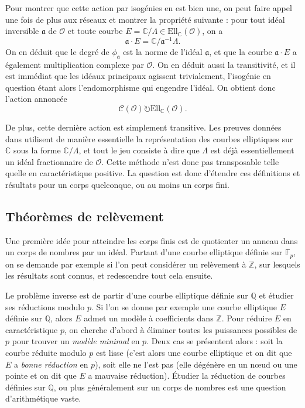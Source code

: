 \documentclass[11pt,a4paper]{article}
\newcommand{\Z}{\mathbb{Z}}
\newcommand{\C}{\mathbb{C}}
\newcommand{\F}{\mathbb{F}}
\newcommand{\Q}{\mathbb{Q}}
\renewcommand{\O}{\mathcal{O}}
\newcommand{\Cl}{\mathcal{C}}
\newcommand{\Ell}{\mathrm{Ell}}
\renewcommand{\frak}{\mathfrak}
\renewcommand{\v}{\vspace{5mm}}
\theoremstyle{definition}
\begin{document}
\v

Pour montrer que cette action par isogénies en est bien une, on peut faire appel une fois de plus aux réseaux et montrer la propriété suivante : pour tout idéal inversible $\frak a$ de $\O$ et toute courbe $E=\C/\Lambda\in \Ell_\C(\O)$, on a
$$\frak a\cdot E = \C/\frak a^{-1} \Lambda.$$
On en déduit que le degré de $\phi_{\frak a}$ est la norme de l'idéal $\frak a$, et que la courbe $\frak a\cdot E$ a également multiplication complexe par $\O$. On en déduit aussi la transitivité, et il est immédiat que les idéaux principaux agissent trivialement, l'isogénie en question étant alors l'endomorphisme qui engendre l'idéal. On obtient donc l'action annoncée
$$\Cl(\O) \circlearrowright \Ell_\C(\O).$$

De plus, cette dernière action est simplement transitive. Les preuves données dans \cite{Sil2} utilisent de manière essentielle la représentation des courbes elliptiques sur $\C$ sous la forme $\C/\Lambda$, et tout le jeu consiste à dire que $\Lambda$ est déjà essentiellement un idéal fractionnaire de $\O$. Cette méthode n'est donc pas transposable telle quelle en caractéristique positive. La question est donc d'étendre ces définitions et résultats pour un corps quelconque, ou au moins un corps fini.

\subsection{Théorèmes de relèvement}

Une première idée pour atteindre les corps finis est de quotienter un anneau dans un corps de nombres par un idéal. Partant d'une courbe elliptique définie sur $\F_p$, on se demande par exemple si l'on peut considérer un relèvement à $\Z$, sur lesquels les résultats sont connus, et redescendre tout cela ensuite. 

Le problème inverse est de partir d'une courbe elliptique définie sur $\Q$ et étudier ses réductions modulo $p$. Si l'on se donne par exemple une courbe elliptique $E$ définie sur $\Q$, alors $E$ admet un modèle à coefficients dans $\Z$. Pour réduire $E$ en caractéristique $p$, on cherche d'abord à éliminer toutes les puissances possibles de $p$ pour trouver un \emph{modèle minimal} en $p$. Deux cas se présentent alors : soit la courbe réduite modulo $p$ est lisse (c'est alors une courbe elliptique et on dit que $E$ a \emph{bonne réduction} en $p$), soit elle ne l'est pas (elle dégénère en un n\oe ud ou une pointe et on dit que $E$ a mauvaise réduction). Étudier la réduction de courbes définies sur $\Q$, ou plus généralement sur un corps de nombres est une question d'arithmétique vaste.
\end{document}
